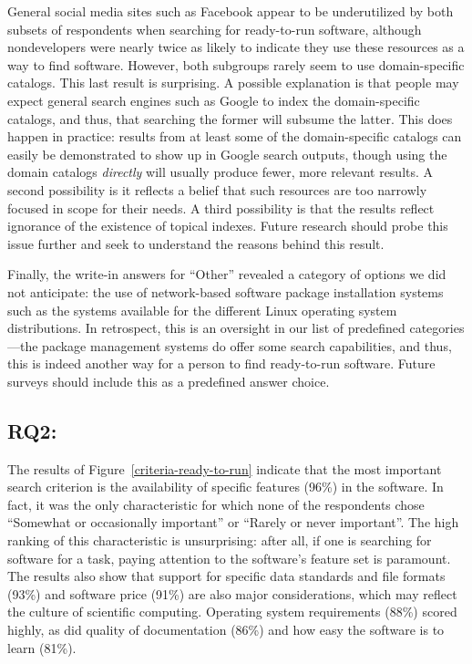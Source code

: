 \documentclass[review]{elsarticle}
\begin{document}
General social media sites such as Facebook appear to be underutilized by both subsets of respondents when searching for ready-to-run software, although nondevelopers were nearly twice as likely to indicate they use these resources as a way to find software.  However, both subgroups rarely seem to use domain-specific catalogs.  This last result is surprising.  A possible explanation is that people may expect general search engines such as Google to index the domain-specific catalogs, and thus, that searching the former will subsume the latter.  This does happen in practice: results from at least some of the domain-specific catalogs can easily be demonstrated to show up in Google search outputs, though using the domain catalogs \emph{directly} will usually produce fewer, more relevant results.  A second possibility is it reflects a belief that such resources are too narrowly focused in scope for their needs.  A third possibility is that the results reflect ignorance of the existence of topical indexes.  Future research should probe this issue further and seek to understand the reasons behind this result.

Finally, the write-in answers for ``Other'' revealed a category of options we did not anticipate: the use of network-based software package installation systems such as the systems available for the different Linux operating system distributions.  In retrospect, this is an oversight in our list of predefined categories---the package management systems do offer some search capabilities, and thus, this is indeed another way for a person to find ready-to-run software.  Future surveys should include this as a predefined answer choice.


\subsection{RQ2: \rqtwotext}
\label{discussion-rqtwo}

The results of Figure~\ref{criteria-ready-to-run} indicate that the most important search criterion is the availability of specific features (96\%) in the software.  In fact, it was the only characteristic for which none of the respondents chose ``Somewhat or occasionally important'' or ``Rarely or never important''.  The high ranking of this characteristic is unsurprising: after all, if one is searching for software for a task, paying attention to the software's feature set is paramount.  The results also show that support for specific data standards and file formats (93\%) and software price (91\%) are also major considerations, which may reflect the culture of scientific computing.  Operating system requirements (88\%) scored highly, as did quality of documentation (86\%) and how easy the software is to learn (81\%).
\end{document}
